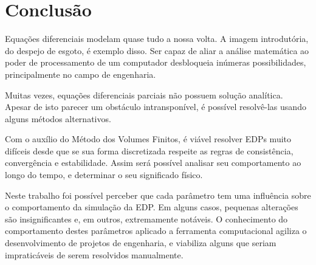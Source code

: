 \chapter{Conclusão}
Equações diferenciais modelam quase tudo a nossa volta. A imagem introdutória,
do despejo de esgoto, é exemplo disso. Ser capaz de aliar a análise matemática
ao poder de processamento de um computador desbloqueia inúmeras possibilidades,
principalmente no campo de engenharia.

Muitas vezes, equações diferenciais parciais não possuem solução analítica.
Apesar de isto parecer um obstáculo intransponível, é possível resolvê-las
usando alguns métodos alternativos.

Com o auxílio do Método dos Volumes Finitos, é viável resolver EDPs muito
difíceis desde que se sua forma discretizada respeite as regras de
consistência, convergência e estabilidade. Assim será possível analisar seu
comportamento ao longo do tempo, e determinar o seu significado físico.

Neste trabalho foi possível perceber que cada parâmetro tem uma influência
sobre o comportamento da simulação da EDP. Em alguns casos, pequenas alterações
são insignificantes e, em outros, extremamente notáveis. O conhecimento do
comportamento destes parâmetros aplicado a ferramenta computacional agiliza o
desenvolvimento de projetos de engenharia, e viabiliza alguns que seriam
impraticáveis de serem resolvidos manualmente.